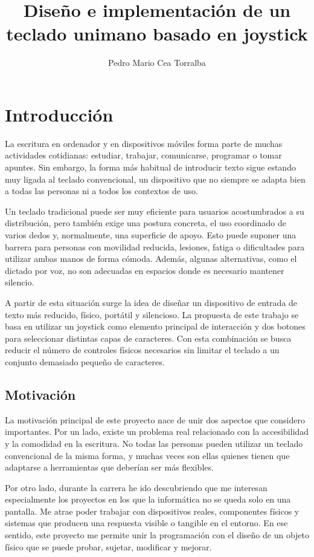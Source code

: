 \documentclass[
    school=etsisi,
    type=pfg,
    degree=61CI,
]{upm-report}
\title{Diseño e implementación de un teclado unimano basado en joystick}
\author{Pedro Mario Cea Torralba}
\begin{document}
\chapter{Introducción}
\label{ch:introduccion}

La escritura en ordenador y en dispositivos móviles forma parte de muchas
actividades cotidianas: estudiar, trabajar, comunicarse, programar o tomar
apuntes. Sin embargo, la forma más habitual de introducir texto sigue estando
muy ligada al teclado convencional, un dispositivo que no siempre se adapta bien
a todas las personas ni a todos los contextos de uso.

Un teclado tradicional puede ser muy eficiente para usuarios acostumbrados a su
distribución, pero también exige una postura concreta, el uso coordinado de
varios dedos y, normalmente, una superficie de apoyo. Esto puede suponer una
barrera para personas con movilidad reducida, lesiones, fatiga o dificultades
para utilizar ambas manos de forma cómoda. Además, algunas alternativas, como el
dictado por voz, no son adecuadas en espacios donde es necesario mantener
silencio.

A partir de esta situación surge la idea de diseñar un dispositivo de entrada de
texto más reducido, físico, portátil y silencioso. La propuesta de este trabajo
se basa en utilizar un joystick como elemento principal de interacción y dos
botones para seleccionar distintas capas de caracteres. Con esta combinación se
busca reducir el número de controles físicos necesarios sin limitar el teclado a
un conjunto demasiado pequeño de caracteres.

\section{Motivación}
\label{sec:motivacion}

La motivación principal de este proyecto nace de unir dos aspectos que considero
importantes. Por un lado, existe un problema real relacionado con la accesibilidad
y la comodidad en la escritura. No todas las personas pueden utilizar un teclado
convencional de la misma forma, y muchas veces son ellas quienes tienen que
adaptarse a herramientas que deberían ser más flexibles.

Por otro lado, durante la carrera he ido descubriendo que me interesan especialmente los proyectos en los que la informática no se queda solo en una pantalla. Me atrae poder trabajar con dispositivos reales, componentes físicos y sistemas que producen una respuesta visible o tangible en el entorno. En ese sentido, este proyecto me permite unir la programación con el diseño de un objeto físico que se puede probar, sujetar, modificar y mejorar.
\end{document}
